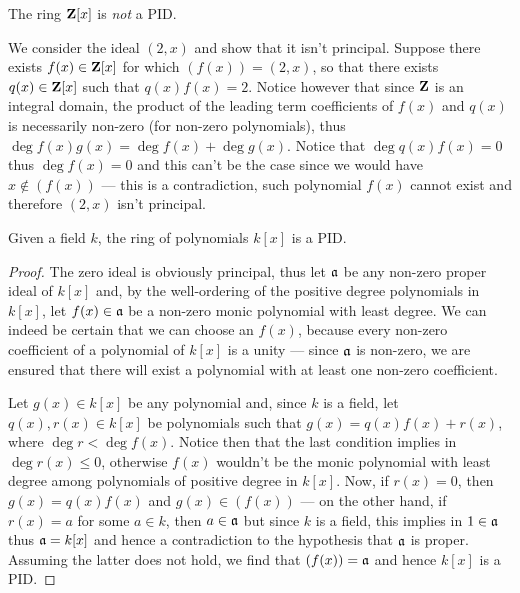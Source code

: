 \begin{example}
    \label{exp:Z[x]-isnt-PID}
    The ring \(\mathbf{Z}[x]\) is \emph{not} a PID.

    We consider the ideal \((2, x)\) and show that it isn't principal. Suppose there
    exists \(f(x) \in \mathbf{Z}[x]\) for which \((f(x)) = (2, x)\), so that there exists
    \(q(x) \in \mathbf{Z}[x]\) such that \(q(x) f(x) = 2\). Notice however that since \(\mathbf{Z}\)
    is an integral domain, the product of the leading term coefficients of \(f(x)\)
    and \(q(x)\) is necessarily non-zero (for non-zero polynomials), thus
    \(\deg f(x) g(x) = \deg f(x) + \deg g(x)\). Notice that \(\deg q(x) f(x) = 0\)
    thus \(\deg f(x) = 0\) and this can't be the case since we would have
    \(x \notin (f(x))\) --- this is a contradiction, such polynomial \(f(x)\) cannot
    exist and therefore \((2, x)\) isn't principal.
\end{example}

\begin{proposition}
    \label{prop:k[x]-is-PID}
    Given a field \(k\), the ring of polynomials \(k[x]\) is a PID.
\end{proposition}

\begin{proof}
    The zero ideal is obviously principal, thus let \(\mathfrak{a}\) be any non-zero
    proper ideal of \(k[x]\) and, by the well-ordering of the positive degree
    polynomials in \(k[x]\), let \(f(x) \in \mathfrak{a}\) be a non-zero monic
    polynomial with least degree.  We can indeed be certain that we can choose an
    \(f(x)\), because every non-zero coefficient of a polynomial of \(k[x]\) is a
    unity --- since \(\mathfrak{a}\) is non-zero, we are ensured that there will exist
    a polynomial with at least one non-zero coefficient.

    Let \(g(x) \in k[x]\) be any polynomial and, since \(k\) is a field, let
    \(q(x), r(x) \in k[x]\) be polynomials such that \(g(x) = q(x) f(x) + r(x)\),
    where \(\deg r < \deg f(x)\). Notice then that the last condition implies in
    \(\deg r(x) \leq 0\), otherwise \(f(x)\) wouldn't be the monic polynomial with
    least degree among polynomials of positive degree in \(k[x]\). Now, if
    \(r(x) = 0\), then \(g(x) = q(x) f(x)\) and \(g(x) \in (f(x))\) --- on the other
    hand, if \(r(x) = a\) for some \(a \in k\), then \(a \in \mathfrak{a}\) but since
    \(k\) is a field, this implies in \(1 \in \mathfrak{a}\) thus \(\mathfrak{a} = k[x]\)
    and hence a contradiction to the hypothesis that \(\mathfrak{a}\) is
    proper. Assuming the latter does not hold, we find that \((f(x)) = \mathfrak{a}\)
    and hence \(k[x]\) is a PID.
\end{proof}

